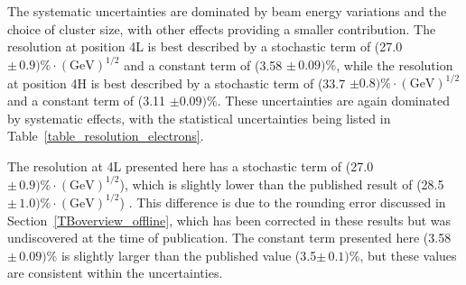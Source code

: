The systematic uncertainties are dominated by beam energy variations and the choice of cluster size, with other effects providing a smaller contribution. The resolution at position 4L is best described by a stochastic term of (27.0 $\pm \, 0.9) \% \cdot (\mathrm{GeV})^{1/2}$ and a constant term of (3.58 $\pm \, 0.09) \%$, while the resolution at position 4H is best described by a stochastic term of (33.7 $\pm 0.8) \% \cdot (\mathrm{GeV})^{1/2}$ and a constant term of (3.11 $\pm 0.09) \%$. These uncertainties are again dominated by systematic effects, with the statistical uncertainties being listed in Table~\ref{table_resolution_electrons}.

The resolution at 4L presented here has a stochastic term of (27.0 $\pm \, 0.9) \% \cdot (\mathrm{GeV})^{1/2}$), which is slightly lower than the published result of (28.5 $\pm \, 1.0) \% \cdot (\mathrm{GeV})^{1/2}$)  \cite{Fcalpaper}. This difference is due to the rounding error discussed in Section~\ref{TBoverview_offline}, which has been corrected in these results but was undiscovered at the time of publication. The constant term presented here (3.58 $\pm \, 0.09) \%$ is slightly larger than the published value (3.5$\pm \, 0.1) \%$, but these values are consistent within the uncertainties. 










%


